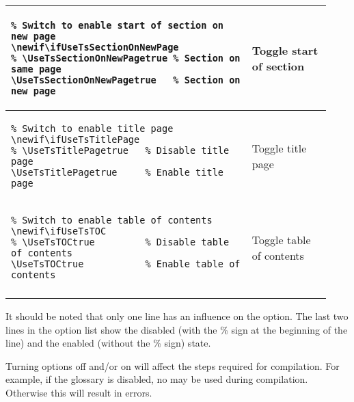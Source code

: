 \begin{footnotesize}
\begin{longtable}{ | P{0.7\linewidth} | p{0.23\linewidth} | }
        \begin{BVerbatim}
\newif\ifUseTsSectionOnNewPage
\UseTsSectionOnNewPagetrue   %
        \end{BVerbatim}
         & Toggle start \newline of section                                    \\
        \hline
        \begin{BVerbatim}
\newif\ifUseTsTitlePage
\UseTsTitlePagetrue     %
        \end{BVerbatim}
         & Toggle title page                                                   \\
        \hline
        \begin{BVerbatim}
\newif\ifUseTsTOC
\UseTsTOCtrue           %
        \end{BVerbatim}
         & Toggle table \newline of contents                                   \\
        \hline
    \end{longtable}
\end{footnotesize}

It should be noted that only one line has an influence on the option. The last
two lines in the option list show the disabled (with the \% sign at the
beginning of the line) and the enabled (without the \% sign) state.
\bigbreak

 Turning options off and/or on will affect the steps
required for compilation. For example, if the glossary is disabled, no
 may be used during compilation. Otherwise this will
result in errors.
